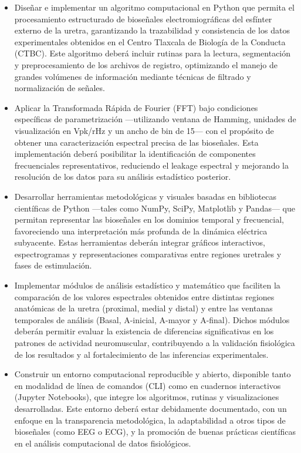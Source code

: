 \begin{itemize}
	\item Diseñar e implementar un algoritmo computacional en Python que permita el procesamiento estructurado de bioseñales electromiográficas del esfínter externo de la uretra, garantizando la trazabilidad y consistencia de los datos experimentales obtenidos en el Centro Tlaxcala de Biología de la Conducta (CTBC). Este algoritmo deberá incluir rutinas para la lectura, segmentación y preprocesamiento de los archivos de registro, optimizando el manejo de grandes volúmenes de información mediante técnicas de filtrado y normalización de señales.
	
	\item Aplicar la Transformada Rápida de Fourier (FFT) bajo condiciones específicas de parametrización —utilizando ventana de Hamming, unidades de visualización en Vpk/rHz y un ancho de bin de 15— con el propósito de obtener una caracterización espectral precisa de las bioseñales. Esta implementación deberá posibilitar la identificación de componentes frecuenciales representativos, reduciendo el leakage espectral y mejorando la resolución de los datos para su análisis estadístico posterior.
			
	\item Desarrollar herramientas metodológicas y visuales basadas en bibliotecas científicas de Python —tales como NumPy, SciPy, Matplotlib y Pandas— que permitan representar las bioseñales en los dominios temporal y frecuencial, favoreciendo una interpretación más profunda de la dinámica eléctrica subyacente. Estas herramientas deberán integrar gráficos interactivos, espectrogramas y representaciones comparativas entre regiones uretrales y fases de estimulación.
	
	\item Implementar módulos de análisis estadístico y matemático que faciliten la comparación de los valores espectrales obtenidos entre distintas regiones anatómicas de la uretra (proximal, medial y distal) y entre las ventanas temporales de análisis (Basal, A-inicial, A-mayor y A-final). Dichos módulos deberán permitir evaluar la existencia de diferencias significativas en los patrones de actividad neuromuscular, contribuyendo a la validación fisiológica de los resultados y al fortalecimiento de las inferencias experimentales.
	
	\item Construir un entorno computacional reproducible y abierto, disponible tanto en modalidad de línea de comandos (CLI) como en cuadernos interactivos (Jupyter Notebooks), que integre los algoritmos, rutinas y visualizaciones desarrolladas. Este entorno deberá estar debidamente documentado, con un enfoque en la transparencia metodológica, la adaptabilidad a otros tipos de bioseñales (como EEG o ECG), y la promoción de buenas prácticas científicas en el análisis computacional de datos fisiológicos.
	

\end{itemize}
